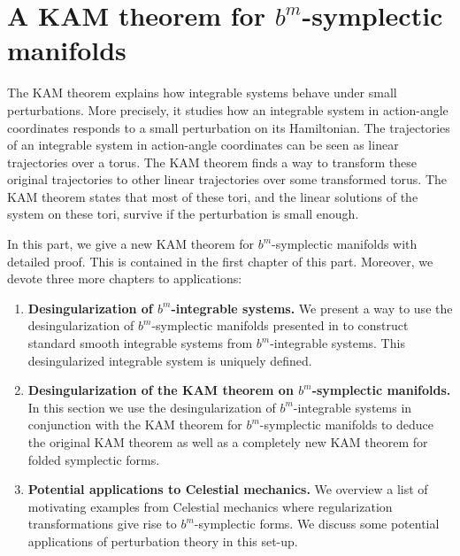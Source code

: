%
%
% 

\part{A KAM theorem for $b^m$-symplectic manifolds} 

The KAM theorem explains how integrable systems behave under small perturbations. More precisely, it studies how an integrable system in action-angle coordinates responds to a small perturbation on its Hamiltonian. The trajectories of an integrable system in action-angle coordinates can be seen as linear trajectories over a torus. The KAM theorem finds a way to transform these original trajectories to other linear trajectories over some transformed torus. The KAM theorem states that most of these tori, and the linear solutions of the system on these tori, survive if the perturbation is small enough.


In this part, we give a new KAM theorem for $b^m$-symplectic manifolds with detailed proof. This is contained in the first chapter of this part. 
Moreover, we devote three more chapters to applications:

\begin{enumerate}
\item \textbf{Desingularization of $b^m$-integrable systems.} We present a way to use the desingularization of $b^m$-symplectic manifolds presented in \cite{GMW17} to construct standard smooth integrable systems from $b^m$-integrable systems. This desingularized integrable system is uniquely defined.
\item \textbf{Desingularization of the KAM theorem on $b^m$-symplectic manifolds.} In this section we use the desingularization of $b^m$-integrable systems in conjunction with the KAM theorem for $b^m$-symplectic manifolds to deduce the original KAM theorem as well as a completely new KAM theorem for folded symplectic forms.
\item \textbf{Potential applications to Celestial mechanics.} We overview a list of motivating examples from Celestial mechanics where regularization transformations give rise to $b^m$-symplectic forms. We discuss some potential applications of perturbation theory in this set-up.
 \end{enumerate}
